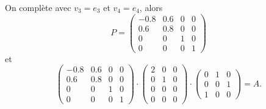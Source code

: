 \begin{example}
\begin{displaymath}
\end{displaymath}
On complète avec $v_3 = e_3$ et $v_4 = e_4$, alors 
\begin{displaymath}
P =   \begin{pmatrix}-0.8 & 0.6 & 0 & 0\\0.6 & 0.8 & 0 & 0\\0 & 0 & 1 & 0\\0 & 0 & 0 & 1\end{pmatrix}
\end{displaymath}
et 
\begin{displaymath}
  \begin{pmatrix}-0.8 & 0.6 & 0 & 0\\0.6 & 0.8 & 0 & 0\\0 & 0 & 1 & 0\\0 & 0 & 0 & 1\end{pmatrix} \cdot
  \begin{pmatrix}
    2 & 0 & 0 \\
    0 & 1 & 0 \\
    0 & 0 & 0 \\
    0 & 0 & 0
  \end{pmatrix}
\cdot
\begin{pmatrix}
  0 & 1 & 0\\0 & 0 & 1\\1 & 0 & 0 
\end{pmatrix} = A. 
\end{displaymath}

\end{example}

